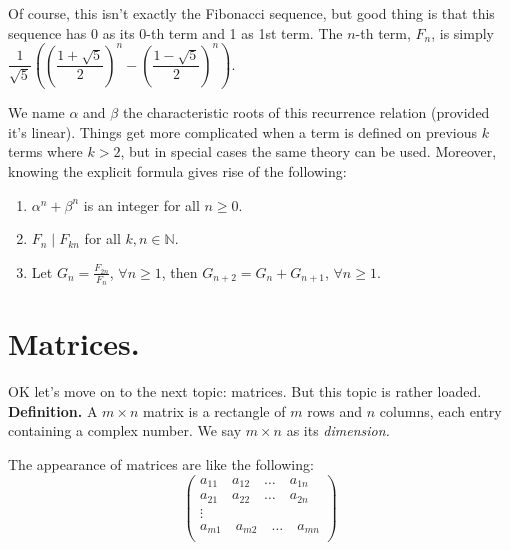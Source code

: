 \documentclass[11pt,a4paper]{article}
\begin{document}
\begin{enumerate}
Of course, this isn't exactly the Fibonacci sequence, but good thing is that this sequence has 0 as its 0-th term and 1 as 1st term. The $n$-th term, $F_{n}$, is simply $\dfrac{1}{\sqrt{5}}\left(\left(\dfrac{1+\sqrt{5}}{2}\right)^{n}-\left(\dfrac{1-\sqrt{5}}{2}\right)^{n}\right)$.
\end{enumerate}

We name $\alpha$ and $\beta$ the characteristic roots of this recurrence relation (provided it's linear). Things get more complicated when a term is defined on previous $k$ terms where $k>2$, but in special cases the same theory can be used. Moreover, knowing the explicit formula gives rise of the following:
\begin {enumerate}
\item $\alpha^n+\beta^n$ is an integer for all $n\ge 0$.
\item $F_{n}\mid F_{kn}$ for all $k, n\in\mathbb{N}$.
\item Let $G_{n}=\frac{F_{2n}}{F_n}$, $\forall n\ge 1$, then $G_{n+2}=G_{n}+G_{n+1}$, $\forall n\ge 1$.
\end{enumerate}

\section {Matrices.}
OK let's move on to the next topic: matrices. But this topic is rather loaded.\\
\textbf{Definition.} A $m\times n$ matrix is a rectangle of $m$ rows and $n$ columns, each entry containing a complex number. We say $m\times n$ as its \emph{dimension.}

The appearance of matrices are like the following:\\
 \[\left( \begin{array}{cccc}
a_{11} \quad a_{12} \quad \ldots \quad a_{1n}\\
a_{21} \quad a_{22} \quad \ldots \quad a_{2n}\\
\vdots\\
a_{m1} \quad a_{m2} \quad \ldots \quad a_{mn}\\
\end{array} \right)\]
\end{document}
